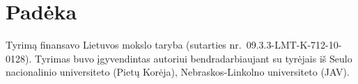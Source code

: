 \documentclass[a4paper, 12pt]{article}
\begin{document}
\section*{Padėka} 
Tyrimą finansavo Lietuvos mokslo taryba (sutarties nr.\ 09.3.3-LMT-K-712-10-0128).
Tyrimas buvo įgyvendintas autoriui bendradarbiaujant su tyrėjais iš Seulo nacionalinio universiteto (Pietų Korėja),
Nebraskos-Linkolno universiteto (JAV).




\end{document}
